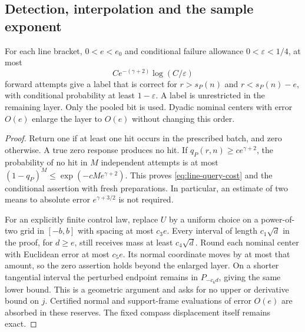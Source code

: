 \subsection{Detection, interpolation and the sample exponent}
\begin{proposition}\label{prop:line-query}
For each line bracket, $0<e<e_0$ and conditional failure allowance
$0<\varepsilon<1/4$, at most
\begin{equation}\label{eq:line-query-cost}
                 C e^{-(\gamma+2)}\log(C/\varepsilon)
\end{equation}
forward attempts give a label that is correct for $r>s_P(n)$ and
$r<s_P(n)-e$, with conditional probability at least $1-\varepsilon$.
A label is unrestricted in the remaining layer. Only the pooled bit
is used. Dyadic nominal centers with error $O(e)$ enlarge the layer
to $O(e)$ without changing this order.
\end{proposition}
\begin{proof}
Return one if at least one hit occurs in the prescribed batch, and
zero otherwise. A true zero response produces no hit. If
$q_P(r,n)\ge c e^{\gamma+2}$, the probability of no hit in $M$
independent attempts is at most
$(1-q_P)^M\le\exp(-cMe^{\gamma+2})$.
This proves \eqref{eq:line-query-cost} and the conditional assertion
with fresh preparations. In particular, an estimate of two means to
absolute error $e^{\gamma+3/2}$ is not required.

For an explicitly finite control law, replace $U$ by a uniform choice
on a power-of-two grid in $[-b,b]$ with spacing at most $c_3e$.
Every interval of length $c_1\sqrt d$ in the proof, for $d\ge e$,
still receives mass at least $c_4\sqrt d$. Round each nominal center
with Euclidean error at most $c_5e$. Its normal coordinate moves by
at most that amount, so the zero assertion holds beyond the enlarged
layer. On a shorter tangential interval the perturbed endpoint remains
in $P_{-c_6d}$, giving the same lower bound. This is a geometric
argument and asks for no upper or derivative bound on $j$. Certified
normal and support-frame evaluations of error $O(e)$ are absorbed in
these reserves. The fixed compass displacement itself remains exact.
\end{proof}

